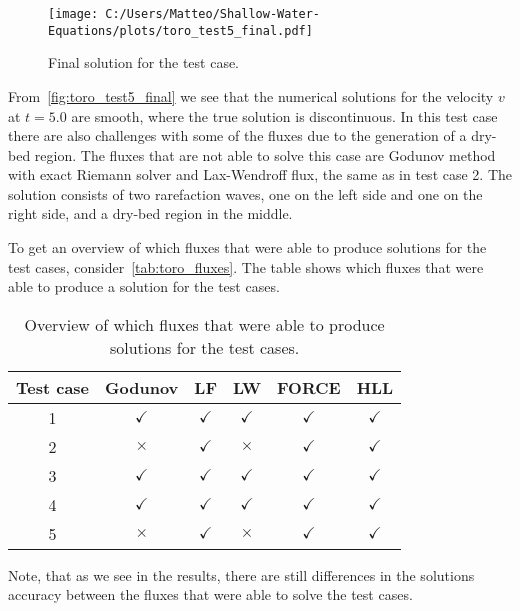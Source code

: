 \begin{figure}[H]
    \centering
    \texttt{[image: C:/Users/Matteo/Shallow-Water-Equations/plots/toro\_test5\_final.pdf]}
    \caption{Final solution for the test case.}\label{fig:toro_test5_final}
\end{figure}
From~\autoref{fig:toro_test5_final} we see that the numerical solutions for the velocity $v$ at $t=5.0$ are smooth, where the true solution is discontinuous. 
In this test case there are also challenges with some of the fluxes due to the generation of a dry-bed region.
The fluxes that are not able to solve this case are Godunov method with exact Riemann solver and Lax-Wendroff flux, the same as in test case 2.
The solution consists of two rarefaction waves, one on the left side and one on the right side, and a dry-bed region in the middle.

To get an overview of which fluxes that were able to produce solutions for the test cases, consider~\autoref{tab:toro_fluxes}.
The table shows which fluxes that were able to produce a solution for the test cases.
\begin{table}[H]
    \centering
    \begin{tabular}{c|c|c|c|c|c}
        \hline
        \textbf{Test case} & \textbf{Godunov} & \textbf{LF} & \textbf{LW} & \textbf{FORCE} & \textbf{HLL}   \\
        \hline\hline
        1 & $\checkmark$ & $\checkmark$ & $\checkmark$ & $\checkmark$ & $\checkmark$   \\
        2 & $\times$ & $\checkmark$ & $\times$ & $\checkmark$ & $\checkmark$ \\
        3 & $\checkmark$ & $\checkmark$ & $\checkmark$ & $\checkmark$ & $\checkmark$  \\
        4 & $\checkmark$ & $\checkmark$ & $\checkmark$ & $\checkmark$ & $\checkmark$  \\
        5 & $\times$ & $\checkmark$ & $\times$ & $\checkmark$ & $\checkmark$  \\
        \hline
    \end{tabular}
    \caption{Overview of which fluxes that were able to produce solutions for the test cases.}\label{tab:toro_fluxes}
\end{table}
Note, that as we see in the results, there are still differences in the solutions accuracy between the fluxes that were able to solve the test cases.

